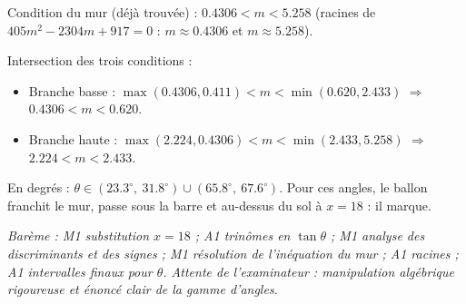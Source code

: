 \documentclass[11pt]{article}
\begin{document}
\begin{corrige}
\begin{enumerate}
Condition du mur (d\'ej\`a trouv\'ee) : $0.4306 < m < 5.258$ (racines de $405m^2 - 2304m + 917 = 0$ : $m \approx 0.4306$ et $m \approx 5.258$).

Intersection des trois conditions :
\begin{itemize}
\item Branche basse : $\max(0.4306, 0.411) < m < \min(0.620, 2.433)$ $\Rightarrow$ $0.4306 < m < 0.620$.
\item Branche haute : $\max(2.224, 0.4306) < m < \min(2.433, 5.258)$ $\Rightarrow$ $2.224 < m < 2.433$.
\end{itemize}
En degr\'es : $\theta \in (23.3^\circ,\ 31.8^\circ) \cup (65.8^\circ,\ 67.6^\circ)$.
Pour ces angles, le ballon franchit le mur, passe sous la barre et au-dessus du sol \`a $x = 18$ : il marque.

\emph{Bar\`eme : M1 substitution $x = 18$ ; A1 trin\^omes en $\tan\theta$ ; M1 analyse des discriminants et des signes ; M1 r\'esolution de l'in\'equation du mur ; A1 racines ; A1 intervalles finaux pour $\theta$. Attente de l'examinateur : manipulation alg\'ebrique rigoureuse et \'enonc\'e clair de la gamme d'angles.}
\end{enumerate}
\end{corrige}
\end{document}
